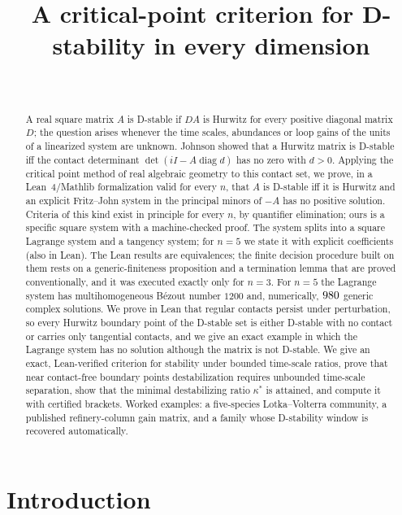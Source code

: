 \documentclass[11pt,a4paper]{article}
\title{A critical-point criterion for D-stability in every dimension}
\author{\PaperAuthor\\[2pt]\small\PaperAffiliation}
\date{\PaperDate}
\theoremstyle{plain}
\theoremstyle{definition}
\newcommand{\diag}{\operatorname{diag}}
\newcommand{\ks}{\kappa^{*}}
\begin{document}
\maketitle

\begin{abstract}
A real square matrix $A$ is D-stable if $DA$ is Hurwitz for every positive diagonal matrix $D$; the question
arises whenever the time scales, abundances or loop gains of the units of a linearized system are unknown.
Johnson showed that a Hurwitz matrix is D-stable iff the contact determinant $\det(iI-A\diag d)$ has no zero
with $d>0$. Applying the critical point method of real algebraic geometry to this contact set, we prove, in a
Lean~4/Mathlib formalization valid for every $n$, that $A$ is D-stable iff it is Hurwitz and an explicit
Fritz--John system in the principal minors of $-A$ has no positive solution. Criteria of this kind exist in
principle for every $n$, by quantifier elimination; ours is a specific square system with a machine-checked proof.
The system splits into a square
Lagrange system and a tangency system; for $n=5$ we state it with explicit coefficients (also in Lean). The Lean
results are equivalences; the finite decision procedure built on them rests on a generic-finiteness proposition
and a termination lemma that are proved conventionally, and it was executed exactly only for $n=3$. For $n=5$ the
Lagrange system has multihomogeneous B\'ezout number $1200$ and, numerically, $980$ generic complex
solutions. We prove in Lean that regular contacts persist under perturbation, so every Hurwitz boundary point of
the D-stable set is either D-stable with no contact or carries only tangential contacts, and we give an exact
example in which the Lagrange system has no solution although the matrix is not D-stable. We give an exact,
Lean-verified criterion for stability under bounded time-scale ratios, prove that near contact-free boundary
points destabilization requires unbounded time-scale separation, show that the minimal destabilizing ratio
$\ks$ is attained, and compute it with certified brackets. Worked examples: a five-species Lotka--Volterra
community, a published refinery-column gain matrix, and a family whose D-stability window is recovered
automatically.
\end{abstract}

\section{Introduction}\label{sec:intro}
\end{document}
